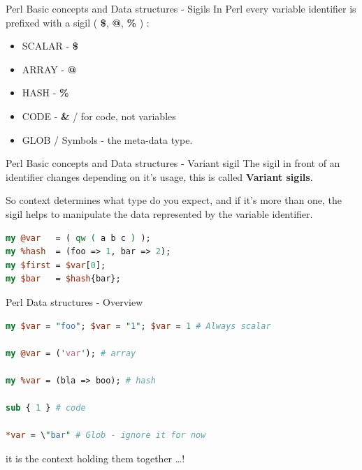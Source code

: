 \documentclass[10pt]{beamer}
\begin{document}
\begin{frame}[fragile]{Perl Basic concepts and Data structures - Sigils}
  In Perl every variable identifier is prefixed with a sigil ( \textbf{\$}, \textbf{@}, \textbf{\%} ) :

  \begin{itemize}
      \item SCALAR - \textbf{\$}
      \item ARRAY - \textbf{@}
      \item HASH -  \textbf{\%}
      \item CODE -  \textbf{\&} / for code, not variables
      \item GLOB  \textbf{\*} / Symbols - the meta-data type.
  \end{itemize}
\end{frame}

\begin{frame}[fragile]{Perl Basic concepts and Data structures - Variant sigil}
The sigil in front of an identifier changes depending on it's usage, this is called \textbf{Variant sigils}.

So context determines what type do you expect, and if it's more than one, the sigil helps to manipulate the data represented by the variable identifier.
\begin{lstlisting}[language=perl]
my @var   = ( qw ( a b c ) );
my %hash  = (foo => 1, bar => 2);
my $first = $var[0];
my $bar   = $hash{bar};
\end{lstlisting}

\end{frame}

\begin{frame}[fragile]{Perl Data structures - Overview}

\begin{lstlisting}[language=perl]
my $var = "foo"; $var = "1"; $var = 1 # Always scalar

my @var = ('var'); # array

my %var = (bla => boo); # hash

sub { 1 } # code

*var = \"bar" # Glob - ignore it for now
\end{lstlisting}

  it is the context holding them together \ldots !
\end{frame}
\end{document}
